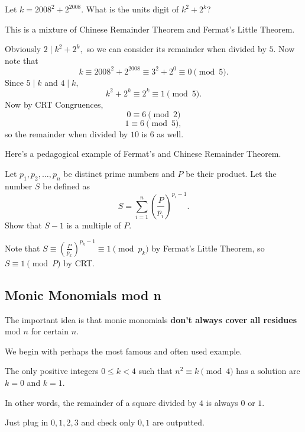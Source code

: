 \documentclass[blue,onecol]{shooting}
\begin{document}
\begin{exam}[AMC 12A 2008/15]
Let $k={2008}^{2}+{2}^{2008}$. What is the units digit of $k^2+2^k$?
\end{exam}

\begin{sol}
This is a mixture of Chinese Remainder Theorem and Fermat's Little Theorem.

Obviously $2\mid k^2+2^k,$ so we can consider its remainder when divided by $5.$ Now note that
\[k\equiv {2008}^{2}+{2}^{2008}\equiv 3^2+2^0\equiv 0\pmod{5}.\]
Since $5\mid k$ and $4\mid k,$
\[k^2+2^k\equiv 2^k\equiv 1\pmod{5}.\]
Now by CRT Congruences,
\[0\equiv 6\pmod{2}\]
\[1\equiv 6\pmod{5},\]
so the remainder when divided by $10$ is $6$ as well.
\end{sol}

Here's a pedagogical example of Fermat's and Chinese Remainder Theorem.

\begin{exam}
Let $p_1,p_2,\ldots,p_n$ be distinct prime numbers and $P$ be their product. Let the number $S$ be defined as
\[S=\sum\limits_{i=1}^{n}\left(\frac{P}{p_i}\right)^{p_i-1}.\]
Show that $S-1$ is a multiple of $P.$
\end{exam}

\begin{sol}
Note that $S\equiv \left(\frac{P}{p_k}\right)^{p_k-1}\equiv 1\pmod{p_k}$ by Fermat's Little Theorem, so $S\equiv 1\pmod{P}$ by CRT.
\end{sol}

\subsection{Monic Monomials mod n}
The important idea is that monic monomials \textbf{don't always cover all residues} mod $n$ for certain $n.$

We begin with perhaps the most famous and often used example.

\begin{exam}
The only positive integers $0\leq k<4$ such that $n^2\equiv k\pmod{4}$ has a solution are $k=0$ and $k=1.$
\end{exam}

In other words, the remainder of a square divided by $4$ is always $0$ or $1.$

\begin{sol}
Just plug in $0,1,2,3$ and check only $0,1$ are outputted.
\end{sol}
\end{document}
